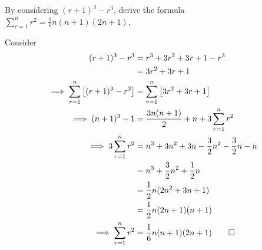 
\begin{question}
    By considering \((r+1)^{3} - r^3\), derive the formula \(\sum_{r=1}^{n } r^2 = \frac{1}{6}n(n+1)(2n+1)\).
\end{question}

\begin{solution}
    Consider
    \begin{align*}
        (r+1)^{3} - r^3 &= r^3 + 3r^2 + 3r + 1 - r^3 \\
        &= 3r^2 + 3r + 1 \\
        \implies \sum_{r=1}^{n } \left[ (r+1)^{3} - r^3 \right] &= \sum_{r=1}^{n } \left[ 3r^2 + 3r + 1\right] \\
        \implies (n+1)^{3} - 1 &= \frac{3n (n+1)}{2}  + n + 3 \sum_{r=1}^{n } r^2 \\
        \implies 3 \sum_{r=1}^{n } r^2 &= n^3 + 3n^2 + 3n - \frac{3}{2} n^2 - \frac{3}{2}n - n \\
        &= n^3 + \frac{3}{2} n^2 + \frac{1}{2} n \\
        &= \frac{1}{2}n (2n^2 + 3n + 1) \\
        &= \frac{1}{2}n (2n+1)(n+1) \\
        \implies \sum_{r=1}^{n } r^2 &= \frac{1}{6} n(n+1)(2n+1 ) \qed
    \end{align*}

\end{solution}